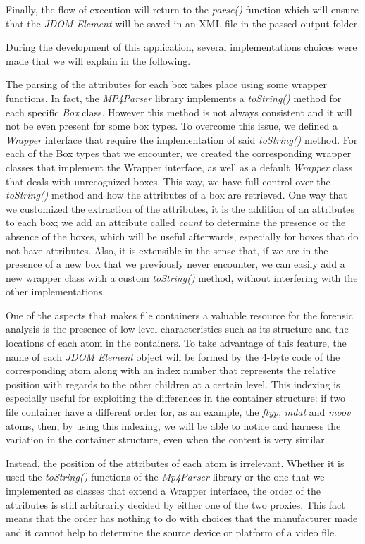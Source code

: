 Finally, the flow of execution will return to the \emph{parse()} function which will ensure that the \emph{JDOM Element} will be saved in an XML file in the passed output folder.

During the development of this application, several implementations choices were made that we will explain in the following.

The parsing of the attributes for each box takes place using some wrapper functions. In fact, the \emph{MP4Parser} library implements a \emph{toString()} method for each specific \emph{Box} class. However this method is not always consistent and it will not be even present for some box types. To overcome this issue, we defined a \emph{Wrapper} interface that require the implementation of said \emph{toString()} method. For each of the Box types that we encounter, we created the corresponding wrapper classes that implement the Wrapper interface, as well as a default \emph{Wrapper} class that deals with unrecognized boxes. This way, we have full control over the \emph{toString()} method and how the attributes of a box are retrieved. One way that we customized the extraction of the attributes, it is the addition of an attributes to each box; we add an attribute called \emph{count} to determine the presence or the absence of the boxes, which will be useful afterwards, especially for boxes that do not have attributes.
Also, it is extensible in the sense that, if we are in the presence of a new box that we previously never encounter, we can easily add a new wrapper class with a custom \emph{toString()} method, without interfering with the other implementations.

One of the aspects that makes file containers a valuable resource for the forensic analysis is the presence of low-level characteristics such as its structure and the locations of each atom in the containers. To take advantage of this feature, the name of each \emph{JDOM Element} object will be formed by the 4-byte code of the corresponding atom along with an index number that represents the relative position with regards to the other children at a certain level. This indexing is especially useful for exploiting the differences in the container structure: if two file container have a different order for, as an example, the \emph{ftyp}, \emph{mdat} and \emph{moov} atoms, then, by using this indexing, we will be able to notice and harness the variation in the container structure, even when the content is very similar.

Instead, the position of the attributes of each atom is irrelevant. Whether it is used the \emph{toString()} functions of the \emph{Mp4Parser} library or the one that we implemented as classes that extend a Wrapper interface, the order of the attributes is still arbitrarily decided by either one of the two proxies. This fact means that the order has nothing to do with choices that the manufacturer made and it cannot help to determine the source device or platform of a video file.


